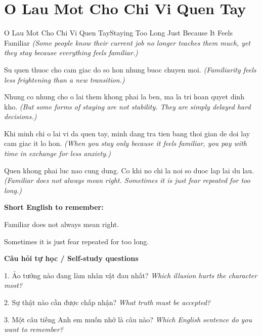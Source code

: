 \section{O Lau Mot Cho Chi Vi Quen Tay}
\begin{truyen}{O Lau Mot Cho Chi Vi Quen Tay}{Staying Too Long Just Because It Feels Familiar}
\textit{(Some people know their current job no longer teaches them much, yet they stay because everything feels familiar.)}

Su quen thuoc cho cam giac do so hon nhung buoc chuyen moi.
\textit{(Familiarity feels less frightening than a new transition.)}

Nhung co nhung cho o lai them khong phai la ben, ma la tri hoan quyet dinh kho.
\textit{(But some forms of staying are not stability. They are simply delayed hard decisions.)}

Khi minh chi o lai vi da quen tay, minh dang tra tien bang thoi gian de doi lay cam giac it lo hon.
\textit{(When you stay only because it feels familiar, you pay with time in exchange for less anxiety.)}

\end{truyen}

\begin{baihoc}
Quen khong phai luc nao cung dung. Co khi no chi la noi so duoc lap lai du lau.
\textit{(Familiar does not always mean right. Sometimes it is just fear repeated for too long.)}
\end{baihoc}

\begin{ghinhoanh}
\textbf{Short English to remember:}

Familiar does not always mean right.

Sometimes it is just fear repeated for too long.

\end{ghinhoanh}

\begin{tuhocnhanh}
\textbf{Câu hỏi tự học / Self-study questions}

1. Ảo tưởng nào đang làm nhân vật đau nhất? \textit{Which illusion hurts the character most?}

2. Sự thật nào cần được chấp nhận? \textit{What truth must be accepted?}

3. Một câu tiếng Anh em muốn nhớ là câu nào? \textit{Which English sentence do you want to remember?}
\end{tuhocnhanh}
\ngancach

